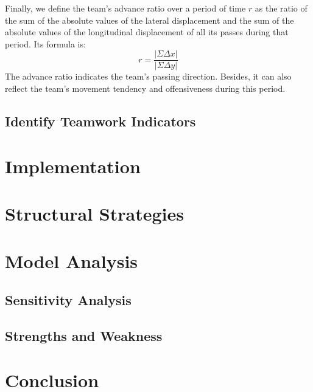 \documentclass{mcmthesis}
\begin{document}
	Finally, we define the team's advance ratio over a period of time $r$ as the ratio of the sum of the absolute values ​​of the lateral displacement and the sum of the absolute values ​​of the longitudinal displacement of all its passes during that period. Its formula is:
	$$r=\frac{|\Sigma \Delta x|}{|\Sigma \Delta y|}$$
	The advance ratio indicates the team's passing direction.  Besides, it can also reflect the team's movement tendency and offensiveness during this period.
\subsection{Identify Teamwork Indicators}
\section{Implementation}
\section{Structural Strategies}
\section{Model Analysis}
\subsection{Sensitivity Analysis}
\subsection{Strengths and Weakness}
\section{Conclusion}


\newpage

\begin{appendices}


\end{appendices}
\end{document}

